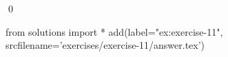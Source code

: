 
\begin{ex} 
  \label{ex:exercise-11}
  
  \qed
\end{ex} 
\begin{python0}
from solutions import *
add(label="ex:exercise-11",
    srcfilename='exercises/exercise-11/answer.tex') 
\end{python0}
